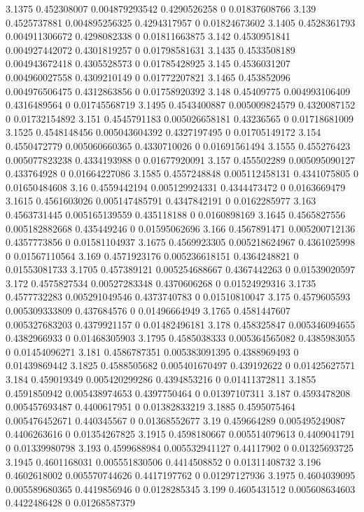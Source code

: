 {3.1375 0.452308007 0.004879293542 0.4290526258 0 0.01837608766
3.139 0.4525737881 0.004895256325 0.4294317957 0 0.01824673602
3.1405 0.4528361793 0.004911306672 0.4298082338 0 0.01811663875
3.142 0.4530951841 0.004927442072 0.4301819257 0 0.01798581631
3.1435 0.4533508189 0.004943672418 0.4305528573 0 0.01785428925
3.145 0.4536031207 0.004960027558 0.4309210149 0 0.01772207821
3.1465 0.453852096 0.004976506475 0.4312863856 0 0.01758920392
3.148 0.45409775 0.004993106409 0.4316489564 0 0.01745568719
3.1495 0.4543400887 0.005009824579 0.4320087152 0 0.01732154892
3.151 0.4545791183 0.005026658181 0.43236565 0 0.01718681009
3.1525 0.4548148456 0.005043604392 0.4327197495 0 0.01705149172
3.154 0.4550472779 0.005060660365 0.4330710026 0 0.01691561494
3.1555 0.455276423 0.005077823238 0.4334193988 0 0.01677920091
3.157 0.455502289 0.005095090127 0.433764928 0 0.01664227086
3.1585 0.4557248848 0.005112458131 0.4341075805 0 0.01650484608
3.16 0.4559442194 0.005129924331 0.4344473472 0 0.0163669479
3.1615 0.4561603026 0.005147485791 0.4347842191 0 0.0162285977
3.163 0.4563731445 0.005165139559 0.435118188 0 0.0160898169
3.1645 0.4565827556 0.005182882668 0.435449246 0 0.01595062696
3.166 0.4567891471 0.005200712136 0.4357773856 0 0.01581104937
3.1675 0.4569923305 0.005218624967 0.4361025998 0 0.01567110564
3.169 0.4571923176 0.005236618151 0.4364248821 0 0.01553081733
3.1705 0.457389121 0.005254688667 0.4367442263 0 0.01539020597
3.172 0.4575827534 0.00527283348 0.4370606268 0 0.01524929316
3.1735 0.4577732283 0.005291049546 0.4373740783 0 0.01510810047
3.175 0.4579605593 0.005309333809 0.437684576 0 0.01496664949
3.1765 0.4581447607 0.005327683203 0.4379921157 0 0.01482496181
3.178 0.458325847 0.005346094655 0.4382966933 0 0.01468305903
3.1795 0.4585038333 0.005364565082 0.4385983055 0 0.01454096271
3.181 0.4586787351 0.005383091395 0.4388969493 0 0.01439869442
3.1825 0.4588505682 0.005401670497 0.439192622 0 0.01425627571
3.184 0.459019349 0.005420299286 0.4394853216 0 0.01411372811
3.1855 0.4591850942 0.005438974653 0.4397750464 0 0.01397107311
3.187 0.4593478208 0.005457693487 0.4400617951 0 0.01382833219
3.1885 0.4595075464 0.005476452671 0.440345567 0 0.01368552677
3.19 0.459664289 0.005495249087 0.4406263616 0 0.01354267825
3.1915 0.4598180667 0.005514079613 0.4409041791 0 0.01339980798
3.193 0.4599688984 0.005532941127 0.44117902 0 0.01325693725
3.1945 0.4601168031 0.005551830506 0.4414508852 0 0.01311408732
3.196 0.4602618002 0.005570744626 0.4417197762 0 0.01297127936
3.1975 0.4604039095 0.005589680365 0.4419856946 0 0.0128285345
3.199 0.4605431512 0.005608634603 0.4422486428 0 0.01268587379
}
